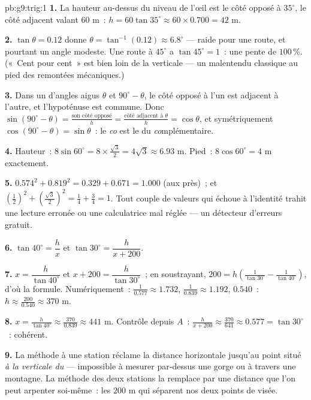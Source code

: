 \begin{solution}{pb:g9:trig:1}
\textbf{1.} La hauteur au-dessus du niveau de l'œil est le côté
opposé à $35^\circ$, le côté adjacent valant $60$ m~:
$h = 60 \tan 35^\circ \approx 60 \times 0.700 = 42$ m.

\textbf{2.} $\tan\theta = 0.12$ donne
$\theta = \tan^{-1}(0.12) \approx 6.8^\circ$ --- raide pour une
route, et pourtant un angle modeste. Une route à $45^\circ$ a
$\tan 45^\circ = 1$~: une pente de $100\,\%$. («~Cent pour cent~»
est bien loin de la verticale --- un malentendu classique au pied
des remontées mécaniques.)

\textbf{3.} Dans un  d'angles aigus $\theta$ et
$90^\circ - \theta$, le côté opposé à l'un est adjacent à l'autre,
et l'hypoténuse est commune. Donc
$\sin(90^\circ - \theta) = \frac{\text{son côté opposé}}{h} =
\frac{\text{côté adjacent à }\theta}{h} = \cos\theta$, et
symétriquement $\cos(90^\circ - \theta) = \sin\theta$~: le
\emph{co} est le  du \emph{co}mplémentaire.

\textbf{4.} Hauteur~: $8 \sin 60^\circ = 8 \times
\frac{\sqrt3}{2} = 4\sqrt3 \approx 6.93$ m. Pied~:
$8 \cos 60^\circ = 4$ m exactement.

\textbf{5.} $0.574^2 + 0.819^2 = 0.329 + 0.671 = 1.000$ (aux
 près)~; et $\left(\frac12\right)^2 +
\left(\frac{\sqrt3}{2}\right)^2 = \frac14 + \frac34 = 1$. Tout
couple de valeurs qui échoue à l'identité trahit une lecture
erronée ou une calculatrice mal réglée --- un détecteur d'erreurs
gratuit.

\textbf{6.} $\tan 40^\circ = \dfrac hx$ et
$\tan 30^\circ = \dfrac{h}{x + 200}$.

\textbf{7.} $x = \dfrac{h}{\tan 40^\circ}$ et
$x + 200 = \dfrac{h}{\tan 30^\circ}$~; en soustrayant,
$200 = h\left(\frac{1}{\tan 30^\circ} -
\frac{1}{\tan 40^\circ}\right)$, d'où la formule. Numériquement~:
$\frac{1}{0.577} \approx 1.732$, $\frac{1}{0.839} \approx 1.192$,
 $0.540$~: $h \approx \frac{200}{0.540} \approx 370$ m.

\textbf{8.} $x = \frac{h}{\tan 40^\circ} \approx
\frac{370}{0.839} \approx 441$ m. Contrôle depuis $A$~:
$\frac{h}{x + 200} \approx \frac{370}{641} \approx 0.577 =
\tan 30^\circ$~: cohérent.

\textbf{9.} La méthode à une station réclame la distance
horizontale jusqu'au point situé \emph{à la verticale du }
--- impossible à mesurer par-dessus une gorge ou à travers une
montagne. La méthode des deux stations la remplace par une distance
que l'on peut arpenter soi-même~: les $200$ m qui séparent nos deux
points de visée.


\end{solution}
